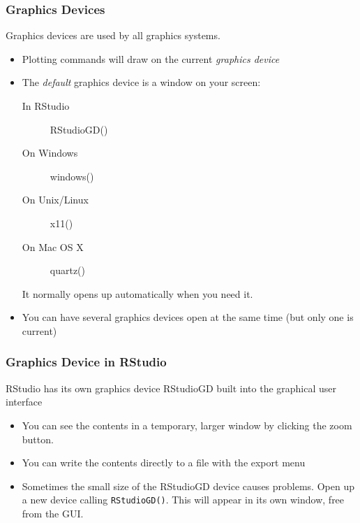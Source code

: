 \documentclass[xcolor=svgnames]{beamer}
\begin{document}
\begin{frame}
  \frametitle{Graphics Devices}
  Graphics devices are used by all graphics systems.
  \begin{itemize}      
  \item Plotting commands will draw on the current {\em graphics device}
  \item The {\em default} graphics device is a window on your screen:
  \begin{description}
  \item[In RStudio] RStudioGD()
  \item[On Windows] windows()
  \item[On Unix/Linux] x11()
  \item[On Mac OS X] quartz()
  \end{description}
  It normally opens up automatically when you need it.
  \item You can have several graphics devices open at the same time (but
    only one is current)
  \end{itemize}
\end{frame}

\begin{frame}
  \frametitle{Graphics Device in RStudio}

  RStudio has its own graphics device RStudioGD built into the graphical
  user interface
  \begin{itemize}
     \item You can see the contents in a temporary, larger window
     by clicking the zoom button.
     \item You can write the contents directly to a file with the export
     menu
     \item Sometimes the small size of the RStudioGD device causes problems. Open
     up a new device calling \texttt{RStudioGD()}. This will appear in
     its own window, free from the GUI.
  \end{itemize}

\end{frame}
\end{document}
